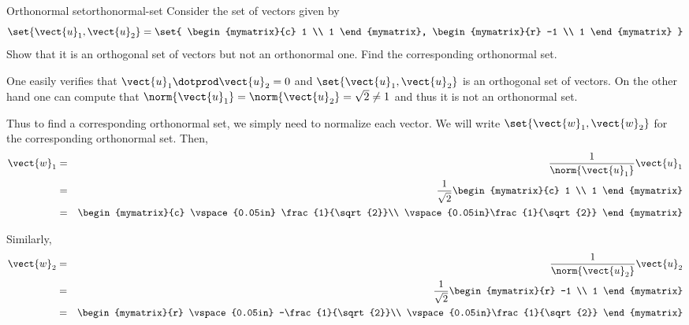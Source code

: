 \begin{example}{Orthonormal set}{orthonormal-set}
Consider the set of vectors  given by
\[
\set{\vect{u}_1, \vect{u}_2 } = \set{
\begin{mymatrix}{c}
1 \\
1
\end{mymatrix},
\begin{mymatrix}{r}
-1 \\
1
\end{mymatrix}
}
\]
Show that it is an orthogonal set of vectors  but not an orthonormal one. Find the corresponding orthonormal set.
\end{example}

\begin{solution}
One easily verifies that $\vect{u}_1 \dotprod \vect{u}_2 = 0$ and
$\set{\vect{u}_1, \vect{u}_2 }$ is an orthogonal set of
vectors. On the other hand one can compute that $\norm{\vect{u}_1}= \norm{\vect{u}_2} =
\sqrt{2} \neq 1$ and thus it is not an orthonormal set.

Thus to find a corresponding orthonormal set, we simply need to
normalize each vector. We will write $\set{\vect{w}_1, \vect{w}_2}$
for the corresponding orthonormal set. Then,
\begin{eqnarray*}
\vect{w}_1 &=& \frac{1}{\norm{\vect{u}_1}} \vect{u}_1\\
&=& \frac{1}{\sqrt{2}} \begin{mymatrix}{c}
1 \\
1
\end{mymatrix} \\
&=&
\begin{mymatrix}{c}
\vspace{0.05in} \frac{1}{\sqrt{2}}\\
\vspace{0.05in}\frac{1}{\sqrt{2}}
\end{mymatrix}
\end{eqnarray*}

Similarly,
\begin{eqnarray*}
\vect{w}_2 &=& \frac{1}{\norm{\vect{u}_2}} \vect{u}_2\\
&=& \frac{1}{\sqrt{2}} \begin{mymatrix}{r}
-1 \\
1
\end{mymatrix} \\
&=&
\begin{mymatrix}{r}
\vspace{0.05in} -\frac{1}{\sqrt{2}}\\
\vspace{0.05in}\frac{1}{\sqrt{2}}
\end{mymatrix}
\end{eqnarray*}


\end{solution}
